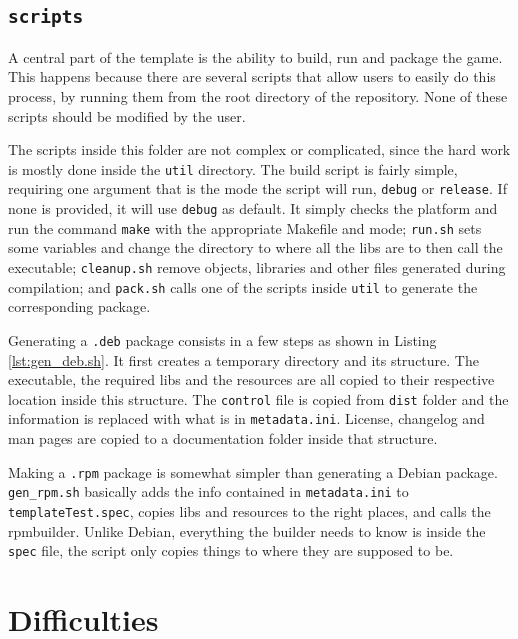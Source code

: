 \subsection{\texttt{scripts}}
\label{sec:scripts_folder}

A central part of the template is the ability to build, run and package the game. This happens because there are several scripts that allow users to easily do this process, by running them from the root directory of the repository. None of these scripts should be modified by the user.

The scripts inside this folder are not complex or complicated, since the hard work is mostly done inside the \texttt{util} directory. The build script is fairly simple, requiring one argument that is the mode the script will run, \texttt{debug} or \texttt{release}. If none is provided, it will use \texttt{debug} as default. It simply checks the platform and run the command \texttt{make} with the appropriate Makefile and mode; \texttt{run.sh} sets some variables and change the directory to where all the libs are to then call the executable; \texttt{cleanup.sh} remove objects, libraries and other files generated during compilation; and \texttt{pack.sh} calls one of the scripts inside \texttt{util} to generate the corresponding package.


Generating a \texttt{.deb} package consists in a few steps as shown in Listing \ref{lst:gen_deb.sh}. It first creates a temporary directory and its structure. The executable, the required libs and the resources are all copied to their respective location inside this structure. The \texttt{control} file is copied from \texttt{dist} folder and the information is replaced with what is in \texttt{metadata.ini}. License, changelog and man pages are copied to a documentation folder inside that structure.




Making a \texttt{.rpm} package is somewhat simpler than generating a Debian package. \texttt{gen\_rpm.sh} basically adds the info contained in \texttt{metadata.ini} to \texttt{templateTest.spec}, copies libs and resources to the right places, and calls the rpmbuilder. Unlike Debian, everything the builder needs to know is inside the \texttt{spec} file, the script only copies things to where they are supposed to be.


\section{Difficulties}
\label{sec:difficulties}


